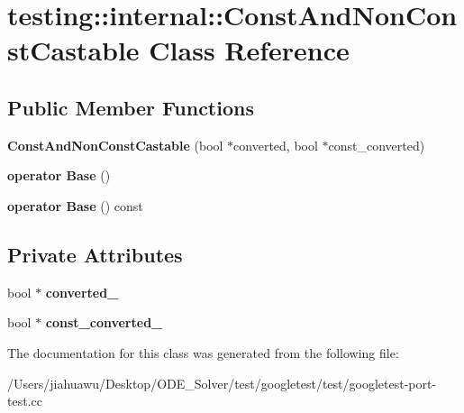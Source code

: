 \hypertarget{classtesting_1_1internal_1_1_const_and_non_const_castable}{}\section{testing\+:\+:internal\+:\+:Const\+And\+Non\+Const\+Castable Class Reference}
\label{classtesting_1_1internal_1_1_const_and_non_const_castable}
\subsection*{Public Member Functions}
\begin{DoxyCompactItemize}
\item 
\mbox{\label{classtesting_1_1internal_1_1_const_and_non_const_castable_aebe0ef6897b7f805e227bb969d4ee034}} 
{\bfseries Const\+And\+Non\+Const\+Castable} (bool $\ast$converted, bool $\ast$const\+\_\+converted)
\item 
\mbox{\label{classtesting_1_1internal_1_1_const_and_non_const_castable_aff0c372d429d76d002bb29f83f2429fa}} 
{\bfseries operator Base} ()
\item 
\mbox{\label{classtesting_1_1internal_1_1_const_and_non_const_castable_a4e8ee8051162f1dfc1da294c71481e2f}} 
{\bfseries operator Base} () const
\end{DoxyCompactItemize}
\subsection*{Private Attributes}
\begin{DoxyCompactItemize}
\item 
\mbox{\label{classtesting_1_1internal_1_1_const_and_non_const_castable_a0c0e17ac5ed0fcccb17d8c40d112ada2}} 
bool $\ast$ {\bfseries converted\+\_\+}
\item 
\mbox{\label{classtesting_1_1internal_1_1_const_and_non_const_castable_a890e63e63b171f3fb9bc32512ab06701}} 
bool $\ast$ {\bfseries const\+\_\+converted\+\_\+}
\end{DoxyCompactItemize}


The documentation for this class was generated from the following file\+:\begin{DoxyCompactItemize}
\item 
/\+Users/jiahuawu/\+Desktop/\+O\+D\+E\+\_\+\+Solver/test/googletest/test/googletest-\/port-\/test.\+cc\end{DoxyCompactItemize}
